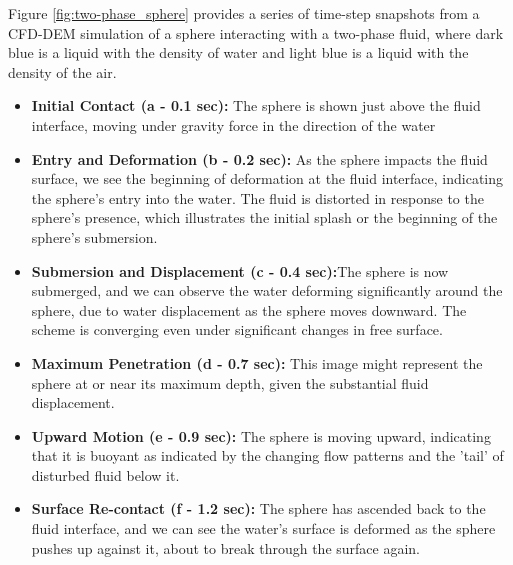 Figure \ref{fig:two-phase_sphere} provides a series of time-step snapshots from a CFD-DEM simulation of a sphere interacting with a two-phase fluid, where dark blue is a liquid with the density of water and light blue is a liquid with the density of the air.

\begin{itemize}
    \item \textbf{Initial Contact (a - 0.1 sec):} The sphere is shown just above the fluid interface, moving under gravity force in the direction of the water
    \item \textbf{Entry and Deformation (b - 0.2 sec):} As the sphere impacts the fluid surface, we see the beginning of deformation at the fluid interface, indicating the sphere's entry into the water. The fluid is distorted in response to the sphere's presence, which illustrates the initial splash or the beginning of the sphere's submersion.
    \item \textbf{Submersion and Displacement (c - 0.4 sec):}The sphere is now submerged, and we can observe the water deforming significantly around the sphere, due to water displacement as the sphere moves downward. The scheme is converging even under significant changes in free surface.
    \item \textbf{Maximum Penetration (d - 0.7 sec):} This image might represent the sphere at or near its maximum depth, given the substantial fluid displacement.
    \item \textbf{Upward Motion (e - 0.9 sec):} The sphere is moving upward, indicating that it is buoyant as indicated by the changing flow patterns and the 'tail' of disturbed fluid below it.
    \item \textbf{Surface Re-contact (f - 1.2 sec):} The sphere has ascended back to the fluid interface, and we can see the water's surface is deformed as the sphere pushes up against it, about to break through the surface again.
\end{itemize}


